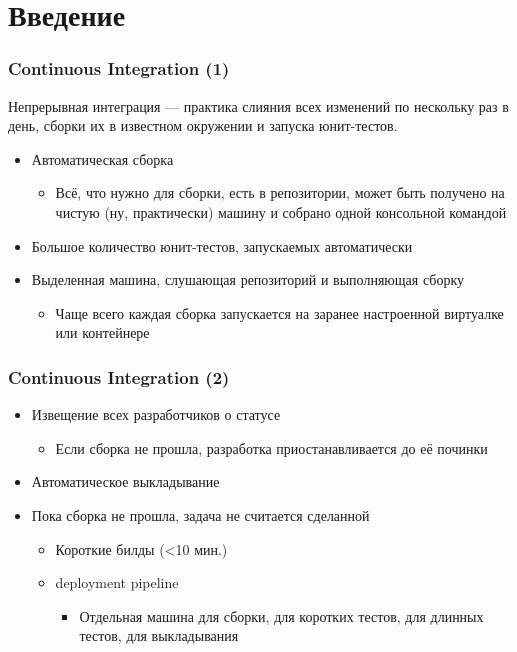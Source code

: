 \documentclass{../../slides-style}
\begin{document}
    
    \begin{frame}[plain]
        \titlepage
    \end{frame}

    \section{Введение}

    \begin{frame}
        \frametitle{Continuous Integration (1)}
        Непрерывная интеграция --- практика слияния всех изменений по нескольку раз в день, сборки их в известном окружении и запуска юнит-тестов.
        \begin{itemize}
            \item Автоматическая сборка
            \begin{itemize}
                \item Всё, что нужно для сборки, есть в репозитории, может быть получено на чистую (ну, практически) машину и собрано одной консольной командой
            \end{itemize}
            \item Большое количество юнит-тестов, запускаемых автоматически
            \item Выделенная машина, слушающая репозиторий и выполняющая сборку
            \begin{itemize}
                \item Чаще всего каждая сборка запускается на заранее настроенной виртуалке или контейнере
            \end{itemize}
        \end{itemize}
    \end{frame}

    \begin{frame}
        \frametitle{Continuous Integration (2)}
        \begin{itemize}
            \item Извещение всех разработчиков о статусе
            \begin{itemize}
                \item Если сборка не прошла, разработка приостанавливается до её починки
            \end{itemize}
            \item Автоматическое выкладывание
            \item Пока сборка не прошла, задача не считается сделанной
            \begin{itemize}
                \item Короткие билды (<10 мин.)
                \item deployment pipeline
                \begin{itemize}
                    \item Отдельная машина для сборки, для коротких тестов, для длинных тестов, для выкладывания
                \end{itemize}
            \end{itemize}
        \end{itemize}
    \end{frame}
\end{document}
